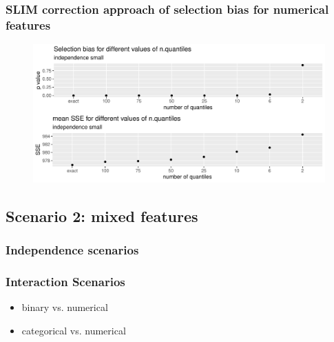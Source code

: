 \subsubsection{SLIM correction approach of selection bias for numerical features}
\begin{figure}
    \includegraphics[width=16cm]{Figures/simulations/batchtools/selection_bias_slim/independence_small.pdf}
\end{figure} 


\subsection{Scenario 2: mixed features}
\subsubsection{Independence scenarios}


\subsubsection{Interaction Scenarios}
\begin{itemize}
    \item binary vs. numerical
    \item categorical vs. numerical
\end{itemize}



